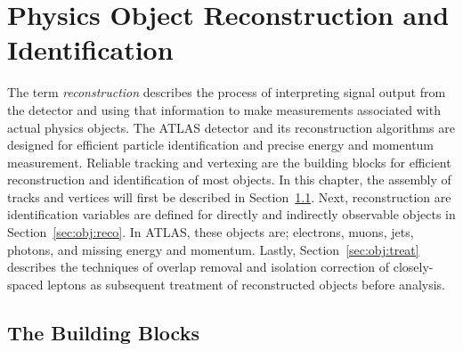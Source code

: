 \chapter{Physics Object Reconstruction and Identification}
\label{ch:obj}
The term \textit{reconstruction} describes the process of interpreting signal output from the detector and using that information to make measurements associated with actual physics objects.  The ATLAS detector and its reconstruction algorithms are designed for efficient particle identification and precise energy and momentum measurement.  Reliable tracking and vertexing are the building blocks for efficient reconstruction and identification of most objects.  In this chapter, the assembly of tracks and vertices will first be described in Section~\ref{sec:obj:bb}.  Next, reconstruction are identification variables are defined for directly and indirectly observable objects in Section~\ref{sec:obj:reco}.  In ATLAS, these objects are; electrons, muons, jets, photons, and missing energy and momentum.  Lastly, Section~\ref{sec:obj:treat} describes the techniques of overlap removal and isolation correction of closely-spaced leptons as subsequent treatment of reconstructed objects before analysis.  

\section{The Building Blocks}
\label{sec:obj:bb}

